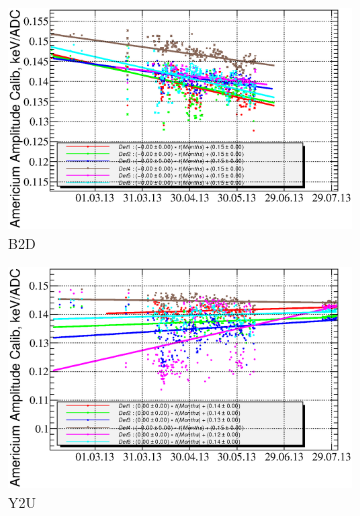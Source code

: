 \documentclass[a4paper,12pt]{article}
\begin{document}
\begin{figure}[p]
%
\begin{subfigure}[t]{0.49\textwidth}
\includegraphics[width=\textwidth]{gfx/run13_alpha_study/B2D/c_chAmGain_by_day_B2D.eps}
\caption{B2D}
\end{subfigure}
%
\hfill
%
\begin{subfigure}[t]{0.49\textwidth}
\includegraphics[width=\textwidth]{gfx/run13_alpha_study/Y2U/c_chAmGain_by_day_Y2U.eps}
\caption{Y2U}
\end{subfigure}
%
\caption{\amgainlabel}
\label{fig:am_gain}
\end{figure}
\end{document}
